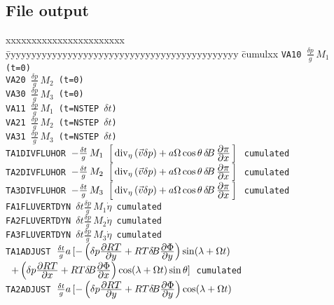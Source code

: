 \subsection*{File output}
\begin{tabbing}
        xxxxxxxxxxxxxxxxxxxxxxx \= yyyyyyyyyyyyyyyyyyyyyyyyyyyyyyyyyyyyyyyyyyyyy \= cumulxx \kill
        \tt VA10                \> $\frac{\delta p}{g}\, M_1$ (t=0) \>  \\ [1ex]
        \tt VA20                \> $\frac{\delta p}{g}\, M_2$ (t=0) \>  \\ [1ex]
        \tt VA30                \> $\frac{\delta p}{g}\, M_3$ (t=0) \>  \\ [1ex]
        \tt VA11                \> $\frac{\delta p}{g}\, M_1$ (t=NSTEP $\delta t$) \>  \\ [1ex]
        \tt VA21                \> $\frac{\delta p}{g}\, M_2$ (t=NSTEP $\delta t$) \>  \\ [1ex]
        \tt VA31                \> $\frac{\delta p}{g}\, M_3$ (t=NSTEP $\delta t$) \>  \\ [1ex]
        \tt TA1DIVFLUHOR        \> $-\frac{\delta t}{g}\, M_1 \,\, \left[ \, \mathop{\rm div}\nolimits_{\eta}\left(\vec{v}\delta p\right) +a\Omega\cos\theta\,\delta \! B\, \frac{\displaystyle \partial \pi}{\displaystyle \partial x}\, \right] \,$ \> cumulated\\ [1ex]
        \tt TA2DIVFLUHOR        \> $-\frac{\delta t}{g}\, M_2 \,\, \left[ \, \mathop{\rm div}\nolimits_{\eta}\left(\vec{v}\delta p\right) +a\Omega\cos\theta\,\delta \! B\, \frac{\displaystyle \partial \pi}{\displaystyle \partial x}\, \right] \,$ \> cumulated\\ [1ex]
        \tt TA3DIVFLUHOR        \> $-\frac{\delta t}{g}\, M_3 \,\, \left[ \, \mathop{\rm div}\nolimits_{\eta}\left(\vec{v}\delta p\right) +a\Omega\cos\theta\,\delta \! B\, \frac{\displaystyle \partial \pi}{\displaystyle \partial x}\, \right] \,$ \> cumulated\\ [1ex]
        \tt FA1FLUVERTDYN       \> $\delta t\frac{\delta p}{g} \,M_1 \dot{\eta}$ \> cumulated\\ [1ex]
        \tt FA2FLUVERTDYN       \> $\delta t\frac{\delta p}{g} \,M_2 \dot{\eta}$ \> cumulated\\ [1ex]
        \tt FA3FLUVERTDYN       \> $\delta t\frac{\delta p}{g} \,M_3 \dot{\eta}$ \> cumulated\\ [1ex]
        \tt TA1ADJUST           \> $\frac{\delta t}{g}a\,[-\left(\delta p\frac{\displaystyle \partial RT}{\displaystyle \partial y}+RT\delta\! B \frac{\displaystyle \partial \Phi}{\displaystyle \partial y}\right)\sin(\lambda+\Omega t)$ \> \\
        \tt                     \> $+\left(\delta p\frac{\displaystyle \partial RT}{\displaystyle \partial x}+RT\delta\! B\frac{\displaystyle \partial \Phi}{\displaystyle \partial x}\right)\cos(\lambda+\Omega t)\sin\theta]$ \> cumulated\\ [1ex]
        \tt TA2ADJUST           \> $\frac{\delta t}{g}a\,[-\left(\delta p\frac{\displaystyle \partial RT}{\displaystyle \partial y}+RT\delta\! B \frac{\displaystyle \partial \Phi}{\displaystyle \partial y}\right)\cos(\lambda+\Omega t)$ \> \\

\end{tabbing}
